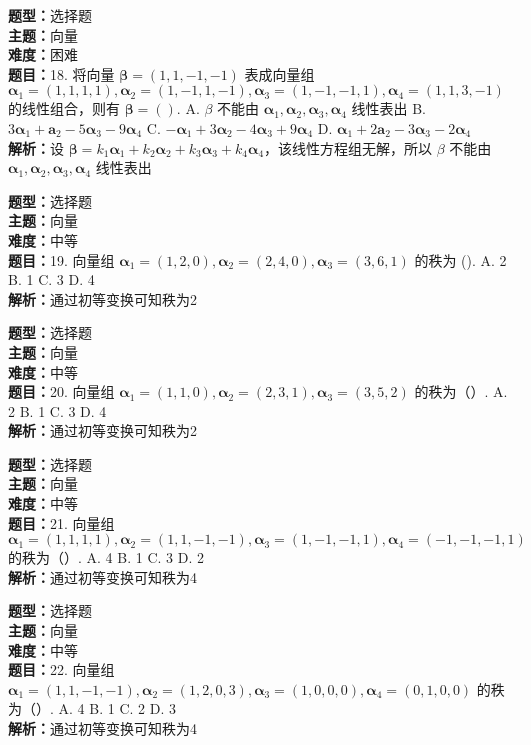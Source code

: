 \documentclass{ctexart}
\newenvironment{question}[5]{%
	\noindent\textbf{题型：}#1\\
	\textbf{主题：}#2\\
	\textbf{难度：}#3\\
	\textbf{题目：}#4\\
	\textbf{解析：}#5\\
	\vspace{1em}
}{}
\begin{document}
	\begin{question}
		{选择题}
		{向量}
		{困难}
		{18. 将向量 \(\boldsymbol{\beta}=(1,1,-1,-1)\) 表成向量组 \(\boldsymbol{\alpha}_1=(1,1,1,1), \boldsymbol{\alpha}_2=(1,-1,1,-1), \boldsymbol{\alpha}_3=(1,-1,-1,1), \boldsymbol{\alpha}_4=(1,1,3,-1)\) 的线性组合，则有 \(\boldsymbol{\beta}=()\). 
			A. \(\beta\) 不能由 \(\boldsymbol{\alpha}_1, \boldsymbol{\alpha}_2, \boldsymbol{\alpha}_3, \boldsymbol{\alpha}_4\) 线性表出
			B. \(3\boldsymbol{\alpha}_1+\boldsymbol{a}_2-5\boldsymbol{\alpha}_3-9\boldsymbol{\alpha}_4\)
			C. \(-\boldsymbol{\alpha}_1+3\boldsymbol{\alpha}_2-4\boldsymbol{\alpha}_3+9\boldsymbol{\alpha}_4\)
			D. \(\boldsymbol{\alpha}_1+2\boldsymbol{a}_2-3\boldsymbol{\alpha}_3-2\boldsymbol{\alpha}_4\)}
		{设 \(\boldsymbol{\beta}=k_1\boldsymbol{\alpha}_1+k_2\boldsymbol{\alpha}_2+k_3\boldsymbol{\alpha}_3+k_4\boldsymbol{\alpha}_4\)，该线性方程组无解，所以 \(\beta\) 不能由 \(\boldsymbol{\alpha}_1, \boldsymbol{\alpha}_2, \boldsymbol{\alpha}_3, \boldsymbol{\alpha}_4\) 线性表出}
	\end{question}
	
	\begin{question}
		{选择题}
		{向量}
		{中等}
		{19. 向量组 \(\boldsymbol{\alpha}_1=(1,2,0), \boldsymbol{\alpha}_2=(2,4,0), \boldsymbol{\alpha}_3=(3,6,1)\) 的秩为 (). 
			A. 2
			B. 1
			C. 3
			D. 4}
		{通过初等变换可知秩为2}
	\end{question}
	
	\begin{question}
		{选择题}
		{向量}
		{中等}
		{20. 向量组 \(\boldsymbol{\alpha}_1=(1,1,0), \boldsymbol{\alpha}_2=(2,3,1), \boldsymbol{\alpha}_3=(3,5,2)\) 的秩为（）. 
			A. 2
			B. 1
			C. 3
			D. 4}
		{通过初等变换可知秩为2}
	\end{question}
	
	\begin{question}
		{选择题}
		{向量}
		{中等}
		{21. 向量组 \(\boldsymbol{\alpha}_1=(1,1,1,1), \boldsymbol{\alpha}_2=(1,1,-1,-1), \boldsymbol{\alpha}_3=(1,-1,-1,1), \boldsymbol{\alpha}_4=(-1,-1,-1,1)\) 的秩为（）. 
			A. 4
			B. 1
			C. 3
			D. 2}
		{通过初等变换可知秩为4}
	\end{question}
	
	\begin{question}
		{选择题}
		{向量}
		{中等}
		{22. 向量组 \(\boldsymbol{\alpha}_1=(1,1,-1,-1), \boldsymbol{\alpha}_2=(1,2,0,3), \boldsymbol{\alpha}_3=(1,0,0,0), \boldsymbol{\alpha}_4=(0,1,0,0)\) 的秩为（）. 
			A. 4
			B. 1
			C. 2
			D. 3}
		{通过初等变换可知秩为4}
	\end{question}
	
\end{document}
